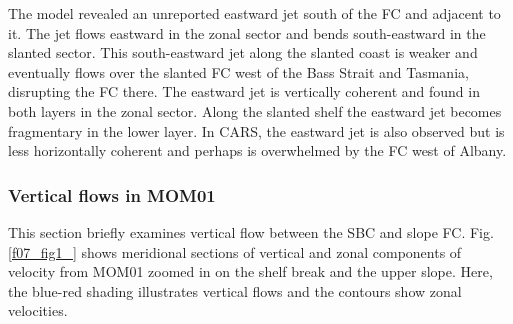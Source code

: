 \documentclass[preprint,3p,review,12pt]{elsarticle}
\begin{document}
The model revealed an unreported eastward jet south of the FC and adjacent to it. The jet flows eastward in the zonal sector and bends south-eastward in the slanted sector. This south-eastward jet along the slanted coast is weaker and eventually flows over the slanted FC west of the Bass Strait and Tasmania, disrupting the FC there.
The eastward jet is vertically coherent and found
in both layers in the zonal sector. Along the slanted shelf the eastward jet becomes fragmentary in the lower layer.
In CARS, the eastward jet is also observed but is less horizontally coherent and perhaps is overwhelmed by the FC west of Albany.

\subsubsection{Vertical flows in MOM01} \label{Vertical flows in MOM01}
This section briefly examines vertical flow between the SBC 
and slope FC\@. Fig.\,\ref{f07_fig1_} shows meridional sections of vertical and zonal components of velocity from MOM01 zoomed in on the shelf break
and the upper slope.
Here, the blue-red shading illustrates vertical flows and the contours show zonal velocities.
\end{document}
